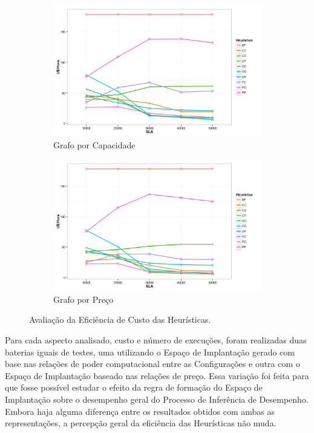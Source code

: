 \begin{figure}[t]
  \centering
    \begin{subfigure}[a]{0.7\textwidth}
      \includegraphics[width=\textwidth]{img/ExecutionCost-Capacity}
      \caption{Grafo por Capacidade}
      \label{fig:eficiencia_custo_capacidade}
    \end{subfigure}
    \begin{subfigure}[b]{0.7\textwidth}
      \includegraphics[width=\textwidth]{img/ExecutionCost-Price}
      \caption{Grafo por Preço}
      \label{fig:eficiencia_custo_preco}
    \end{subfigure}
  \caption{\label{fig:eficiencia_custo}Avaliação da Eficiência de Custo das Heurísticas.}
\end{figure}

Para cada aspecto analisado, custo e número de execuções, foram realizadas duas 
baterias iguais de testes, uma utilizando o Espaço de Implantação gerado com base 
nas relações de poder computacional entre as Configurações e outra com o Espaço de 
Implantação baseado nas relações de preço. Essa variação foi feita para que fosse
possível estudar o efeito da regra de formação do Espaço de Implantação sobre o
desempenho geral do Processo de Inferência de Desempenho. Embora haja alguma 
diferença entre os resultados obtidos com ambas as representações, a percepção 
geral da eficiência das Heurísticas não muda.   

